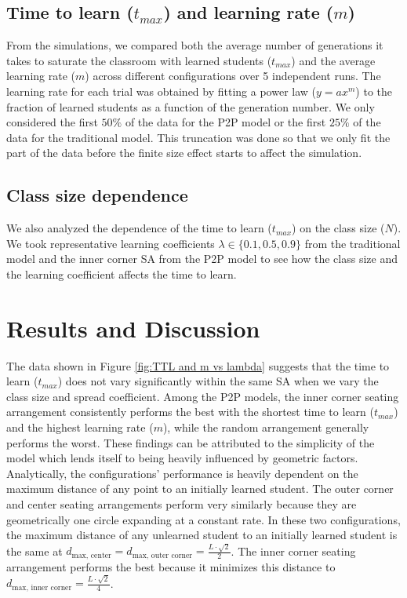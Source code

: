 \documentclass[10pt,a4paper,twoside]{article}
\begin{document}
\subsection{Time to learn ($t_{max}$) and learning rate ($m$)}
From the simulations, we compared both the average number of generations it takes to saturate the classroom with learned students ($t_{max}$) and the average learning rate ($m$) across different configurations over 5 independent runs. The learning rate for each trial was obtained by fitting a power law ($y = ax^m$) to the fraction of learned students as a function of the generation number. We only considered the first $50\%$ of the data for the P2P model or the first $25\%$ of the data for the traditional model. This truncation was done so that we only fit the part of the data before the finite size effect starts to affect the simulation. %

\subsection{Class size dependence}
We also analyzed the dependence of the time to learn ($t_{max}$) on the class size ($N$). We took representative learning coefficients $\lambda \in \lbrace 0.1, 0.5, 0.9 \rbrace$ from the traditional model and the inner corner SA from the P2P model to see how the class size and the learning coefficient affects the time to learn. %

\section{Results and Discussion}
The data shown in Figure \ref{fig:TTL and m vs lambda} suggests that the time to learn ($t_{max}$) does not vary significantly within the same SA when we vary the class size and spread coefficient. Among the P2P models, the inner corner seating arrangement consistently performs the best with the shortest time to learn ($t_{max}$) and the highest learning rate ($m$), while the random arrangement generally performs the worst. These findings can be attributed to the simplicity of the model which lends itself to being heavily influenced by geometric factors. Analytically, the configurations’ performance is heavily dependent on the maximum distance of any point to an initially learned student. The outer corner and center seating arrangements perform very similarly because they are geometrically one circle expanding at a constant rate. In these two configurations, the maximum distance of any unlearned student to an initially learned student is the same at $d_{\text{max, center}} = d_{\text{max, outer corner}}=\frac{L\cdot\sqrt{2}}{2}$. The inner corner seating arrangement performs the best because it minimizes this distance to $d_{\text{max, inner corner}}=\frac{L\cdot\sqrt{2}}{4}$.
\end{document}
